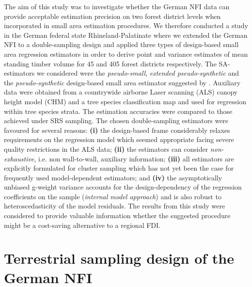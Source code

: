 The aim of this study was to investigate whether the German NFI data can provide acceptable estimation precision on two forest district levels when incorporated in small area estimation procedures. We therefore conducted a study in the German federal state Rhineland-Palatinate where we extended the German NFI to a double-sampling design and applied three types of design-based small area regression estimators in order to derive point and variance estimates of mean standing timber volume for 45 and 405 forest districts respectively. The SA-estimators we considered were the \textit{pseudo-small}, \textit{extended pseudo-synthetic} and the \textit{pseudo-synthetic} design-based small area estimator suggested by \citet{mandallaz2013a, mandallaz2013b}. Auxiliary data were obtained from a countrywide airborne Laser scanning (ALS) canopy height model (CHM) and a tree species classification map and used for regression within tree species strata. The estimation accuracies were compared to those achieved under SRS sampling. The chosen double-sampling estimators were favoured for several reasons: \textbf{(i)} the design-based frame considerably relaxes requirements on the regression model which seemed appropriate facing severe quality restrictions in the ALS data; \textbf{(ii)} the estimators can consider \textit{non-exhaustive}, i.e. non wall-to-wall, auxiliary information; \textbf{(iii)} all estimators are explicitly formulated for cluster sampling which has not yet been the case for frequently used model-dependent estimators; and \textbf{(iv)} the asymptotically unbiased g-weight variance accounts for the design-dependency of the regression coefficients on the sample (\textit{internal model approach}) and is also robust to heteroscedasticity of the model residuals. The results from this study were considered to provide valuable information whether the suggested procedure might be a cost-saving alternative to a regional FDI.\par



\section{Terrestrial sampling design of the German NFI}
\label{sec:germanNFI}


